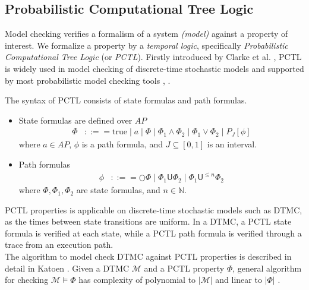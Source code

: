\subsection{Probabilistic Computational Tree Logic}
Model checking verifies a formalism of a system \textit{(model)} against a property of interest. We
formalize a property by a \textit{temporal logic}, specifically \textit{Probabilistic Computational
    Tree Logic} (or \textit{PCTL}). Firstly introduced by Clarke et al. \cite{clarke1986automatic}, PCTL
is widely used in model checking of discrete-time stochastic models and supported by most
probabilistic model checking tools \cite{dehnert2017storm}, \cite{kwiatkowska2011prism}.
\begin{definition}[PCTL] The syntax of PCTL consists of state formulas and path formulas.
    \begin{itemize}
        \item State formulas are defined over $AP$
              \begin{align*}
                  \Phi & ::== \text{true} \;|\; a \;|\; \Phi \;|\; \Phi_1 \wedge \Phi_2 \;|\; \Phi_1 \vee \Phi_2 \;|\;  P_{J}[\phi]
              \end{align*}
              where $a\in AP$, $\phi$ is a path formula, and $J\subseteq[0,1]$ is an interval.
        \item Path formulas
              \begin{align*}
                  \phi & ::== \bigcirc \Phi \;|\; \Phi_1 \mathsf{U} \Phi_2 \;|\; \Phi_1 \mathsf{U}^{\leq n} \Phi_2
              \end{align*}
              where $\Phi,\Phi_1,\Phi_2$ are state formulas, and $n\in \mathbb{N}$.
    \end{itemize}
\end{definition}
PCTL properties is applicable on discrete-time stochastic models such as DTMC, as the times between
state transitions are uniform. In a DTMC, a PCTL state formula is verified at each state, while a
PCTL path formula is verified through a trace from an execution path.\\
The algorithm to model check DTMC against PCTL properties is described in detail in Katoen
\cite{baier2008principles}. Given a DTMC $\mathcal{M}$ and a PCTL property $\Phi$, general algorithm
for checking $\mathcal{M}\models\Phi$ has complexity of polynomial to $|\mathcal{M}|$ and linear to
$|\Phi|$ \cite{katoen2013model}.
